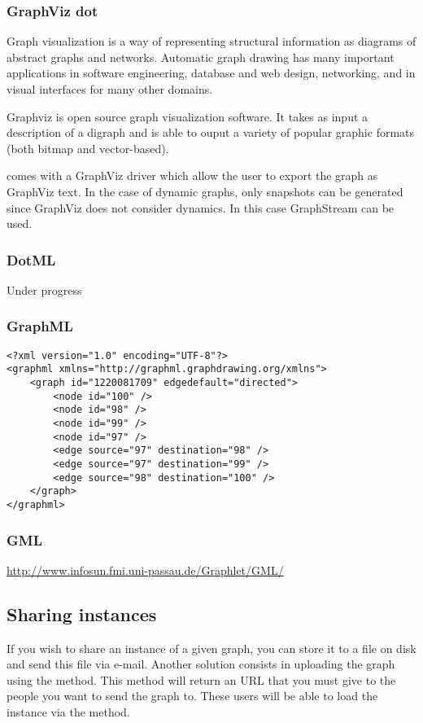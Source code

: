 \documentclass{article}
\begin{document}
\subsubsection{GraphViz dot}
		Graph visualization is a way of representing structural information as
		diagrams of abstract graphs and networks. Automatic graph drawing has many
		important applications in software engineering, database and web design,
		networking, and in visual interfaces for many other domains. 
	
		Graphviz is open source graph visualization software. It takes as input
		a description of a digraph and is able to ouput a variety of popular
		graphic formats (both bitmap and vector-based). 
	
		\grph comes with a GraphViz driver which allow the user to 
		export the graph as GraphViz text. In the case of dynamic graphs,
		only snapshots can be generated since GraphViz does not consider
		dynamics. In this case GraphStream can be used.
	
	\subsubsection{DotML}
	Under progress
		
\subsubsection{GraphML}
\begin{lstlisting}
<?xml version="1.0" encoding="UTF-8"?>
<graphml xmlns="http://graphml.graphdrawing.org/xmlns">
	<graph id="1220081709" edgedefault="directed">
		<node id="100" />
		<node id="98" />
		<node id="99" />
		<node id="97" />
		<edge source="97" destination="98" />
		<edge source="97" destination="99" />
		<edge source="98" destination="100" />
	</graph>
</graphml>
\end{lstlisting}

\subsubsection{GML}
\url{http://www.infosun.fmi.uni-passau.de/Graphlet/GML/}


\subsection{Sharing instances}
If you wish to share an instance of a given graph, you can store it to a file on disk and send this file via e-mail.
Another solution consists in uploading the graph using the  method. This method will return an URL
that you must give to the people you want to send the graph to. These users will be able to load the instance via the 
 method.
\end{document}
